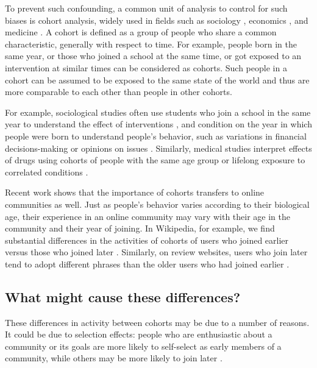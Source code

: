 To prevent such confounding, a common unit of analysis to control for such biases is cohort analysis, widely used in fields such as sociology \cite{Mason2012,Glenn2005}, economics \cite{Attanasio1993,Beldona2005}, and medicine \cite{Howartz1996,Davis2010}. A cohort is defined as a group of people who share a common characteristic, generally with respect to time. For example, people born in the same year, or those who joined a school at the same time, or got exposed to an intervention at similar times can be considered as cohorts. Such people in a cohort can be assumed to be exposed to the same state of the world and thus are more comparable to each other than people in other cohorts. 

For example, sociological studies often use students who join a school in the same year to understand the effect of interventions \cite{Goyette2008,Alexander2012}, and condition on the year in which people were born to understand people's  behavior, such as variations in financial decisions-making \cite{Attanasio1993} or opinions on issues \cite{Firebaugh1988,Jennings1996}. Similarly, medical studies interpret effects of drugs using cohorts of people with the same age group or lifelong exposure to correlated conditions \cite{Howartz1996,Davis2010}.  

Recent work shows that the importance of cohorts transfers to online communities as well. Just as people's behavior varies according to their biological age, their experience in an online community may vary with their age in the community and their year of joining. In Wikipedia, for example, we find substantial differences in the activities of cohorts of users who joined earlier versus those who joined later \cite{Welser2011}. Similarly, on review websites, users who join later tend to adopt different phrases than the older users who had joined earlier \cite{Danescu-niculescu-mizil2013}.

\subsection{What might cause these differences?}

These differences in activity between cohorts may be due to a number of reasons. It could be due to selection effects: people who are enthusiastic about a community or its goals are more likely to self-select as early members of a community, while others may be more likely to join later \cite{Li2008}. 

